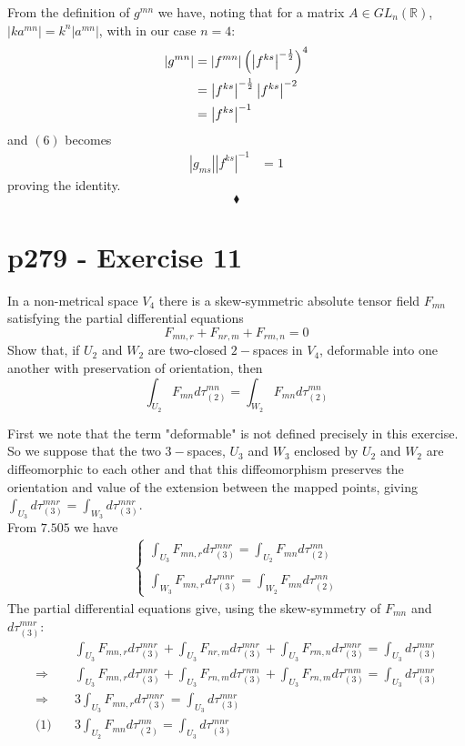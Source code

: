 From the definition of $g^{mn}$ we have, noting that for a matrix $A \in GL_n(\mathbb{R})$, $\left|k a^{mn}\right| = k^n \left| a^{mn}\right|$, with in our case $n=4$:
\begin{align}
\left|g^{mn}\right| &= \left|f^{mn}\right|\left(\left|f^{ks}\right|^{-\frac{1}{2}}\right)^4\\
&=\left|f^{ks}\right|^{-\frac{1}{2}}\left|f^{ks}\right|^{-2}\\
&= \left|f^{ks}\right|^{-1}
\end{align}
and $(6)$ becomes
\begin{align}
\left|g_{ms}\right|\left|f^{ks}\right|^{-1}&= 1
\end{align}
proving the identity.
$$\blacklozenge$$
\newpage


\section{p279 - Exercise 11}
\begin{tcolorbox}
In a non-metrical space $V_4$ there is a skew-symmetric absolute tensor field $F_{mn}$ satisfying the partial differential equations
$$F_{mn,r}+F_{nr,m}+F_{rm,n}=0$$
Show that, if $U_2$ and $W_2$ are two-closed $2-$spaces in $V_4$, deformable into one another with preservation of orientation, then
$$\int_{U_2}F_{mn}d\tau_{(2)}^{mn} = \int_{W_2}F_{mn}d\tau_{(2)}^{mn} $$
\end{tcolorbox}
First we note that the term "deformable" is not defined precisely in this exercise. So we suppose that the two $3-$spaces, $U_3$ and $W_3$ enclosed by $U_2$ and $W_2$ are diffeomorphic to each other and that this diffeomorphism preserves the orientation and value of the extension between the mapped points, giving $\int_{U_3} d\tau_{(3)}^{mnr}=\int_{W_3}d\tau_{(3)}^{mnr}$. \\
From $\mathbf{7.505}$ we have
\begin{align}
\left\{\begin{array}{l}\int_{U_3} F_{mn,r}d\tau_{(3)}^{mnr} = \int_{U_2} F_{mn}d\tau_{(2)}^{mn}\\\\
\int_{W_3} F_{mn,r}d\tau_{(3)}^{mnr} = \int_{W_2} F_{mn}d\tau_{(2)}^{mn}
\end{array}\right.
\end{align}
The partial differential equations give, using the skew-symmetry of $F_{mn}$ and $d\tau_{(3)}^{mnr}$:
\begin{align}
&\int_{U_3} F_{mn,r}d\tau_{(3)}^{mnr}+\int_{U_3} F_{nr,m}d\tau_{(3)}^{mnr}+\int_{U_3} F_{rm,n}d\tau_{(3)}^{mnr}= \int_{U_3} d\tau_{(3)}^{mnr}\\
\Rightarrow \quad &\int_{U_3} F_{mn,r}d\tau_{(3)}^{mnr}+\int_{U_3} F_{rn,m}d\tau_{(3)}^{rnm}+\int_{U_3} F_{rn,m}d\tau_{(3)}^{rnm}= \int_{U_3} d\tau_{(3)}^{mnr}\\
\Rightarrow \quad &3\int_{U_3} F_{mn,r}d\tau_{(3)}^{mnr}= \int_{U_3} d\tau_{(3)}^{mnr}\\
\text{(1)} \quad &3\int_{U_2} F_{mn}d\tau_{(2)}^{mn}= \int_{U_3} d\tau_{(3)}^{mnr}
\end{align}
